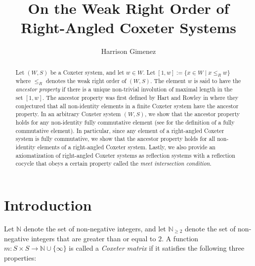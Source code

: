 \documentclass{amsart}
\author[H.~Gimenez]{Harrison Gimenez}
\title{On the Weak Right Order of Right-Angled Coxeter Systems}
\theoremstyle{plain} %
\theoremstyle{definition}
\def\weakr{\leq_{R}}
\def\N{\mathbb{N}}
\begin{document}

\begin{abstract}
     Let $ (W,S)$ be a Coxeter system, and let $ w\in W$. Let $ [1,w] := \{ x\in W \mid x \weakr w \} $ where $ \weakr$ denotes the weak right order of $ (W,S)$. The element $ w$ is said to have the \emph{ancestor property} if there is a unique non-trivial involution of maximal length in the set $ [1,w]$. The ancestor property was first defined by Hart and Rowley in \cite{hart2025noteinvolutionprefixescoxeter} where they conjectured that all non-identity elements in a finite Coxeter system have the ancestor property. In an arbitrary Coxeter system $(W,S)$, we show that the ancestor property holds for any non-identity fully commutative element (see \cite{stembridge1996fully} for the definition of a fully commutative element). In particular, since any element of a right-angled Coxeter system is fully commutative, we show that the ancestor property holds for all non-identity elements of a right-angled Coxeter system. Lastly, we also provide an axiomatization of right-angled Coxeter systems as reflection systems with a reflection cocycle that obeys a certain property called the \emph{meet intersection condition}. 


 \end{abstract}


 \maketitle




\section{Introduction}

Let $\N$ denote the set of non-negative integers, and let $ \N_{\geq 2}$ denote the set of non-negative integers that are greater than or equal to $2$. A function $ m:S \times S \rightarrow \mathbb{N} \cup \{ \infty \}$ is called a \emph{Coxeter matrix} if it satisfies the following three properties:
\end{document}
